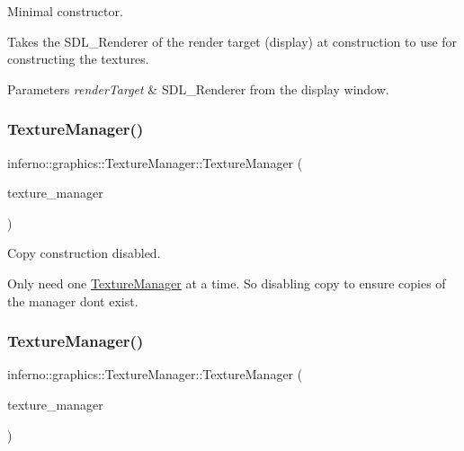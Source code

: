 Minimal constructor. 

Takes the S\+D\+L\+\_\+\+Renderer of the render target (display) at construction to use for constructing the textures. 
\begin{DoxyParams}{Parameters}
{\em render\+Target} & S\+D\+L\+\_\+\+Renderer from the display window. \\
\hline
\end{DoxyParams}
\mbox{\label{classinferno_1_1graphics_1_1_texture_manager_a6aaf05d68384081740e7b59752f5ea86}} 
\subsubsection{\texorpdfstring{Texture\+Manager()}{TextureManager()}\hspace{0.1cm}{\footnotesize\ttfamily [2/3]}}
{\footnotesize\ttfamily inferno\+::graphics\+::\+Texture\+Manager\+::\+Texture\+Manager (\begin{DoxyParamCaption}\item[{const \mbox{\hyperlink{classinferno_1_1graphics_1_1_texture_manager}{Texture\+Manager}} \&}]{texture\+\_\+manager }\end{DoxyParamCaption})\hspace{0.3cm}{\ttfamily [delete]}}



Copy construction disabled. 

Only need one \mbox{\hyperlink{classinferno_1_1graphics_1_1_texture_manager}{Texture\+Manager}} at a time. So disabling copy to ensure copies of the manager don\textquotesingle{}t exist. \mbox{\label{classinferno_1_1graphics_1_1_texture_manager_a91ac9443d92df72ecedee3cf16401965}} 
\subsubsection{\texorpdfstring{Texture\+Manager()}{TextureManager()}\hspace{0.1cm}{\footnotesize\ttfamily [3/3]}}
{\footnotesize\ttfamily inferno\+::graphics\+::\+Texture\+Manager\+::\+Texture\+Manager (\begin{DoxyParamCaption}\item[{\mbox{\hyperlink{classinferno_1_1graphics_1_1_texture_manager}{Texture\+Manager}} \&\&}]{texture\+\_\+manager }\end{DoxyParamCaption})\hspace{0.3cm}{\ttfamily [inline]}}



